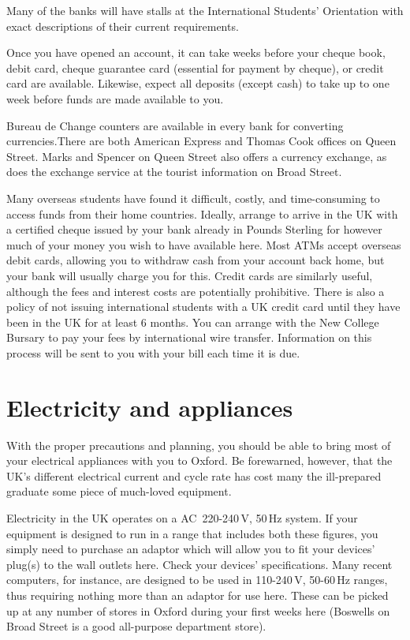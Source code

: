 Many of the banks will have stalls at the International Students' Orientation with exact descriptions of their current requirements.

Once you have opened an account, it can take weeks before your cheque book, debit card, cheque guarantee card (essential for payment by cheque), or credit card are available. Likewise, expect all deposits (except cash) to take up to one week before funds are made available to you. 

Bureau de Change counters are available in every bank for converting currencies.There are both American Express and Thomas Cook offices on Queen Street. Marks and Spencer on Queen Street also offers a currency exchange, as does the exchange service at the tourist information on Broad Street.

Many overseas students have found it difficult, costly, and time-consuming to
access funds from their home countries. Ideally, arrange to arrive in the UK
with a certified cheque issued by your bank already in Pounds Sterling for
however much of your money you wish to have available here. Most ATMs accept
overseas debit cards, allowing you to withdraw cash from your account back home,
but your bank will usually charge you for this. Credit cards are similarly
useful, although the fees and interest costs are potentially prohibitive. There
is also a policy of not issuing international students with a UK credit card
until they have been in the UK for at least 6 months. You can arrange with the
New College Bursary to pay your fees by international wire transfer. Information
on this process will be sent to you with your bill each time it is due. 

\section{Electricity and appliances} With the proper precautions and planning,
you should be able to bring most of your electrical appliances with you to Oxford. Be forewarned, however, that the UK's different electrical current and cycle rate has cost many the ill-prepared graduate some piece of much-loved equipment.

Electricity in the UK operates on a AC~220-240\,V, 50\,Hz system. If your
equipment is designed to run in a range that includes both these figures, you
simply need to purchase an adaptor which will allow you to fit your devices'
plug(s) to the wall outlets here. Check your devices' specifications. Many
recent computers, for instance, are designed to be used in 110-240\,V, 50-60\,Hz
ranges, thus requiring nothing more than an adaptor for use here.
These can be picked up at any number of stores in Oxford during your first weeks
here (Boswells on Broad Street is a good all-purpose department store).

